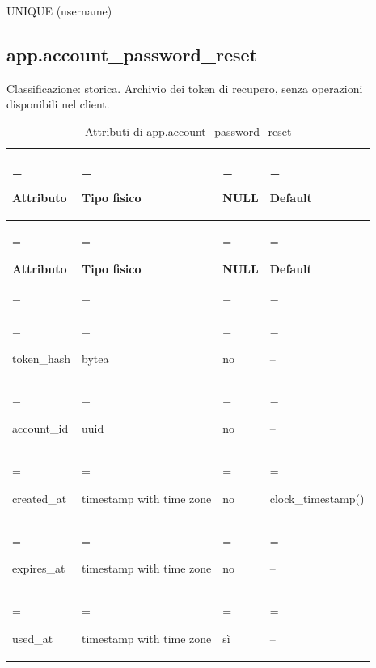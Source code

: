 \documentclass[11pt,a4paper]{article}
\begin{document}
{\ttfamily\small UNIQUE (\allowbreak{}username)}\par

\subsection{app.account\_password\_reset}

Classificazione: storica. Archivio dei token di recupero, senza operazioni disponibili nel client.

{\small \renewcommand{\arraystretch}{1.2}

\begin{xltabular}{\linewidth}{>{\hsize\linewidth=\hsize\raggedright\arraybackslash}X>{\hsize\linewidth=\hsize\raggedright\arraybackslash}X>{\hsize\linewidth=\hsize\raggedright\arraybackslash}X>{\hsize\linewidth=\hsize\raggedright\arraybackslash}X}
\caption{Attributi di app.account\_password\_reset}\label{tab:dictionary-6}\\
\toprule

\textbf{Attributo} & \textbf{Tipo fisico} & \textbf{NULL} & \textbf{Default}\\\midrule\endfirsthead\toprule\textbf{Attributo} & \textbf{Tipo fisico} & \textbf{NULL} & \textbf{Default}\\\midrule\endhead
\midrule{}\\\endfoot\bottomrule\endlastfoot


{\ttfamily\small token\_\allowbreak{}hash} & {\ttfamily\small bytea} & no & {\ttfamily\small --}\\\addlinespace[3pt]

{\ttfamily\small account\_\allowbreak{}id} & {\ttfamily\small uuid} & no & {\ttfamily\small --}\\\addlinespace[3pt]

{\ttfamily\small created\_\allowbreak{}at} & {\ttfamily\small timestamp with time zone} & no & {\ttfamily\small clock\_\allowbreak{}timestamp(\allowbreak{})}\\\addlinespace[3pt]

{\ttfamily\small expires\_\allowbreak{}at} & {\ttfamily\small timestamp with time zone} & no & {\ttfamily\small --}\\\addlinespace[3pt]

{\ttfamily\small used\_\allowbreak{}at} & {\ttfamily\small timestamp with time zone} & sì & {\ttfamily\small --}\\*

\end{xltabular}}
\end{document}
